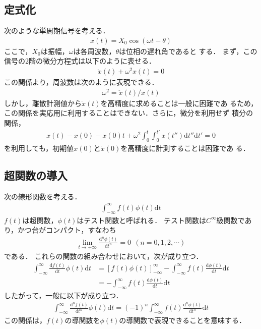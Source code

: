 \documentclass{ieej}
\begin{document}
\subsection{定式化}
次のような単周期信号を考える．
\begin{align}
 x(t)=X_0\cos (\omega t- \theta)
\label{eq:a}
\end{align}
ここで，$X_0$は振幅，$\omega$は各周波数，$\theta$は位相の遅れ角であると
する．
%
まず，この信号の2階の微分方程式は以下のように表せる．
\begin{align}
 \ddot{x}(t)+\omega^2x(t)=0
\label{eq:b}
\end{align}
この関係より，周波数は次のように表現できる．
\begin{align}
 \omega^2=\ddot{x}(t)/x(t)
\label{eq:c}
\end{align}
しかし，離散計測値から$\ddot{x}(t)$を高精度に求めることは一般に困難であ
るため，この関係を実応用に利用することはできない．さらに，微分を利用せず
積分の関係，
\begin{align}
x(t)-x(0)-\dot{x}(0)t+\omega^2\int^t_0\int^{t'}_0x(t'') \mbox{d}t''\mbox{d}t'=0
\label{eq:d}
\end{align}
を利用しても，初期値$x(0)$と$\dot{x}(0)$を高精度に計測することは困難であ
る．

\subsection{超関数の導入}

次の線形関数を考える．
\begin{align}
 \int_{-\infty}^{\infty}f(t)\phi(t)\mbox{d}t
\end{align}
$f(t)$は超関数，$\phi(t)$はテスト関数と呼ばれる．
テスト関数は$C^{\infty}$級関数であり，かつ台がコンパクト，すなわち
\begin{align}
 \lim_{t\to \pm \infty}\frac{\mbox{d}^n\phi(t)}{\mbox{d}t^n} = 0\ \ (n=0,1,2,\cdots)
\end{align}
である．
これらの関数の組み合わせにおいて，次が成り立つ．
\begin{align}
 \int_{-\infty}^{\infty} \frac{\mbox{d} f(t)}{\mbox{d}t}
 \phi(t)\mbox{d}t 
 &=\left[f(t)\phi(t) \right]_{-\infty}^{\infty} -\int_{-\infty}^{\infty} f(t) \frac{\mbox{d} \phi(t)}{\mbox{d}t}
 \mbox{d}t\nonumber\\
 &=-\int_{-\infty}^{\infty} f(t) \frac{\mbox{d} \phi(t)}{\mbox{d}t} \mbox{d}t
\end{align}
したがって，一般に以下が成り立つ．
\begin{align}
 \int_{-\infty}^{\infty} \frac{\mbox{d}^n f(t)}{\mbox{d}t^n}
 \phi(t)\mbox{d}t
 = (-1)^n  \int_{-\infty}^{\infty} f(t) \frac{\mbox{d}^n \phi(t)}{\mbox{d}t^n}
 \mbox{d}t
\end{align}
この関係は，$f(t)$の導関数を$\phi(t)$の導関数で表現できることを意味する．
\end{document}
